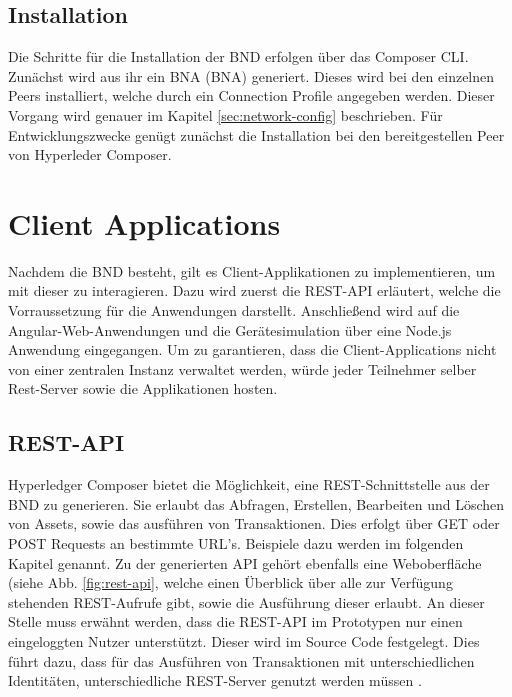 \subsection{Installation}
Die Schritte für die Installation der \acs{BND} erfolgen über das Composer CLI. Zunächst wird aus ihr ein \acl{BNA} (\acs{BNA}) generiert. Dieses wird bei den einzelnen Peers installiert, welche durch ein Connection Profile angegeben werden. Dieser Vorgang wird genauer im Kapitel \ref{sec:network-config} beschrieben. Für Entwicklungszwecke genügt zunächst die Installation bei den bereitgestellen Peer von Hyperleder Composer.

\section{Client Applications}
Nachdem die \acs{BND} besteht, gilt es Client-Applikationen zu implementieren, um mit dieser zu interagieren. Dazu wird zuerst die REST-API erläutert, welche die Vorraussetzung für die Anwendungen darstellt. Anschließend wird auf die Angular-Web-Anwendungen und die Gerätesimulation über eine Node.js Anwendung eingegangen. Um zu garantieren, dass die Client-Applications nicht von einer zentralen Instanz verwaltet werden, würde jeder Teilnehmer selber Rest-Server sowie die Applikationen hosten.

\subsection{REST-API}
\label{subsec:REST}
Hyperledger Composer bietet die Möglichkeit, eine REST-Schnittstelle aus der \acs{BND} zu generieren. Sie erlaubt das Abfragen, Erstellen, Bearbeiten und Löschen von Assets, sowie das ausführen von Transaktionen. Dies erfolgt über GET oder POST Requests an bestimmte URL's. Beispiele dazu werden im folgenden Kapitel genannt. Zu der generierten API gehört ebenfalls eine Weboberfläche (siehe Abb. \ref{fig:rest-api}, welche einen Überblick über alle zur Verfügung stehenden REST-Aufrufe gibt, sowie die Ausführung dieser erlaubt. An dieser Stelle muss erwähnt werden, dass die REST-API im Prototypen nur einen eingeloggten Nutzer unterstützt. Dieser wird im Source Code festgelegt. Dies führt dazu, dass für das Ausführen von Transaktionen mit unterschiedlichen Identitäten, unterschiedliche REST-Server genutzt werden müssen \cite{HyperledgerComposerTeamRESTAPIHyperledger}.

